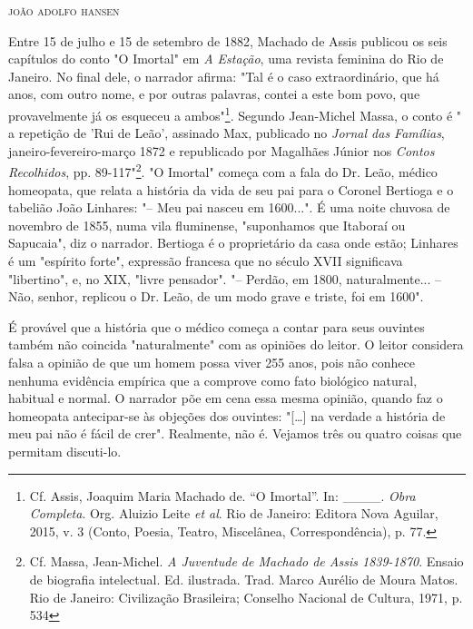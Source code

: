 \begin{flushright}
\textsc{joão adolfo hansen}
\end{flushright}

Entre 15 de julho e 15 de setembro de 1882, Machado de Assis publicou os
seis capítulos do conto "O Imortal" em \emph{A Estação}, uma revista
feminina do Rio de Janeiro. No final dele, o narrador afirma: "Tal é o
caso extraordinário, que há anos, com outro nome, e por outras palavras,
contei a este bom povo, que provavelmente já os esqueceu a
ambos"\footnote{Cf. Assis, Joaquim Maria Machado de. ``O Imortal''. In:
  \_\_\_\_. \emph{Obra Completa}. Org. Aluizio Leite \emph{et al}. Rio
  de Janeiro: Editora Nova Aguilar, 2015, v. 3 (Conto, Poesia, Teatro,
  Miscelânea, Correspondência), p. 77.}. Segundo Jean-Michel Massa, o
conto é " a repetição de 'Rui de Leão', assinado Max, publicado no
\emph{Jornal das Famílias}, janeiro-fevereiro-março 1872 e republicado
por Magalhães Júnior nos \emph{Contos Recolhidos}, pp. 89-117"\footnote{Cf.
  Massa, Jean-Michel. \emph{A Juventude de Machado de Assis 1839-1870}.
  Ensaio de biografia intelectual. Ed. ilustrada. Trad. Marco Aurélio de
  Moura Matos. Rio de Janeiro: Civilização Brasileira; Conselho Nacional
  de Cultura, 1971, p. 534}. "O Imortal" começa com a fala do Dr. Leão,
médico homeopata, que relata a história da vida de seu pai para o
Coronel Bertioga e o tabelião João Linhares: "-- Meu pai nasceu em
1600...". É uma noite chuvosa de novembro de 1855, numa vila fluminense,
"suponhamos que Itaboraí ou Sapucaia", diz o narrador. Bertioga é o
proprietário da casa onde estão; Linhares é um "espírito forte",
expressão francesa que no século XVII significava "libertino", e, no
XIX, "livre pensador". "-- Perdão, em 1800, naturalmente... -- Não,
senhor, replicou o Dr. Leão, de um modo grave e triste, foi em 1600".

É provável que a história que o médico começa a contar para seus
ouvintes também não coincida "naturalmente" com as opiniões do leitor. O
leitor considera falsa a opinião de que um homem possa viver 255 anos,
pois não conhece nenhuma evidência empírica que a comprove como fato
biológico natural, habitual e normal. O narrador põe em cena essa mesma
opinião, quando faz o homeopata antecipar-se às objeções dos ouvintes:
"{[}\ldots{}{]} na verdade a história de meu pai não é fácil de crer".
Realmente, não é. Vejamos três ou quatro coisas que permitam discuti-lo.

